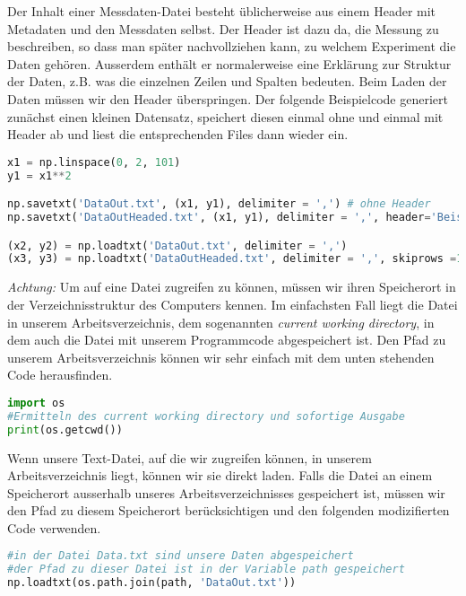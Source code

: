 Der Inhalt einer Messdaten-Datei besteht üblicherweise aus einem Header mit Metadaten und den Messdaten selbst. Der Header ist dazu da, die Messung zu beschreiben, so dass man später nachvollziehen kann, zu welchem Experiment die Daten gehören. Ausserdem enthält er normalerweise eine Erklärung zur Struktur der Daten, z.B. was die einzelnen Zeilen und Spalten bedeuten. Beim Laden der Daten müssen wir den Header überspringen. Der folgende Beispielcode generiert zunächst einen kleinen Datensatz, speichert diesen einmal ohne und einmal mit Header ab und liest die entsprechenden Files dann wieder ein.

\begin{lstlisting}[language = Python]
x1 = np.linspace(0, 2, 101)
y1 = x1**2

np.savetxt('DataOut.txt', (x1, y1), delimiter = ',') # ohne Header
np.savetxt('DataOutHeaded.txt', (x1, y1), delimiter = ',', header='Beispieldatei') # mit Header

(x2, y2) = np.loadtxt('DataOut.txt', delimiter = ',')
(x3, y3) = np.loadtxt('DataOutHeaded.txt', delimiter = ',', skiprows =1)
\end{lstlisting}



\textit{Achtung:} Um auf eine Datei zugreifen zu können, müssen wir ihren Speicherort in der Verzeichnisstruktur des Computers kennen. Im einfachsten Fall liegt die Datei in unserem Arbeitsverzeichnis, dem sogenannten \textit{current working directory}, in dem auch die Datei mit unserem Programmcode abgespeichert ist. Den Pfad zu unserem Arbeitsverzeichnis können wir sehr einfach mit dem unten stehenden Code herausfinden.  
\begin{lstlisting}[language = Python]
import os
#Ermitteln des current working directory und sofortige Ausgabe
print(os.getcwd())
\end{lstlisting}
Wenn unsere Text-Datei, auf die wir zugreifen können, in unserem Arbeitsverzeichnis liegt, können wir sie direkt laden. Falls die Datei an einem Speicherort ausserhalb unseres Arbeitsverzeichnisses gespeichert ist, müssen wir den Pfad zu diesem Speicherort berücksichtigen und den folgenden modizifierten Code verwenden.
\begin{lstlisting}[language = Python]
#in der Datei Data.txt sind unsere Daten abgespeichert
#der Pfad zu dieser Datei ist in der Variable path gespeichert 
np.loadtxt(os.path.join(path, 'DataOut.txt'))
\end{lstlisting}






